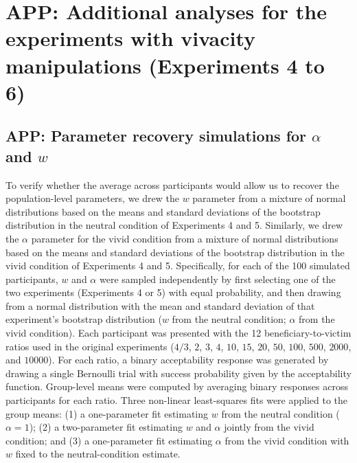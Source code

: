 \documentclass[
]{article}
\begin{document}
\clearpage

\section{APP: Additional analyses for the experiments with vivacity manipulations (Experiments 4 to 6)}\label{app-additional-analyses-for-the-experiments-with-vivacity-manipulations-experiments-4-to-6}

\subsection{\texorpdfstring{APP: Parameter recovery simulations for \(\alpha\) and \(w\)}{APP: Parameter recovery simulations for \textbackslash alpha and w}}\label{app-parameter-recovery-simulations-for-alpha-and-w}

To verify whether the average across participants would allow us to recover the population-level parameters, we drew the \(w\) parameter from a mixture of normal distributions based on the means and standard deviations of the bootstrap distribution in the neutral condition of Experiments 4 and 5. Similarly, we drew the \(\alpha\) parameter for the vivid condition from a mixture of normal distributions based on the means and standard deviations of the bootstrap distribution in the vivid condition of Experiments 4 and 5. Specifically, for each of the 100 simulated participants, \(w\) and \(\alpha\) were sampled independently by first selecting one of the two experiments (Experiments 4 or 5) with equal probability, and then drawing from a normal distribution with the mean and standard deviation of that experiment's bootstrap distribution (\(w\) from the neutral condition; \(\alpha\) from the vivid condition). Each participant was presented with the 12 beneficiary-to-victim ratios used in the original experiments (\(4/3\), \(2\), \(3\), \(4\), \(10\), \(15\), \(20\), \(50\), \(100\), \(500\), \(2000\), and \(10000\)). For each ratio, a binary acceptability response was generated by drawing a single Bernoulli trial with success probability given by the acceptability function. Group-level means were computed by averaging binary responses across participants for each ratio. Three non-linear least-squares fits were applied to the group means: (1) a one-parameter fit estimating \(w\) from the neutral condition (\(\alpha = 1\)); (2) a two-parameter fit estimating \(w\) and \(\alpha\) jointly from the vivid condition; and (3) a one-parameter fit estimating \(\alpha\) from the vivid condition with \(w\) fixed to the neutral-condition estimate.
\end{document}
